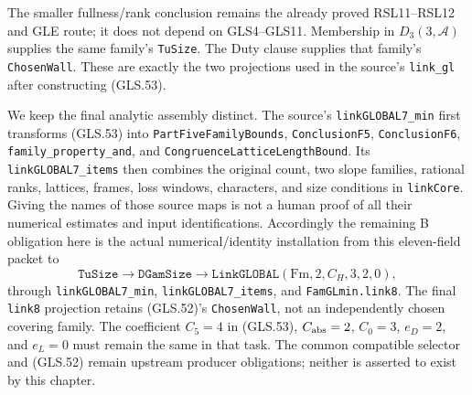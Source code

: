 The smaller fullness/rank conclusion remains the already proved
RSL11--RSL12 and GLE route; it does not depend on GLS4--GLS11.
Membership in $D_3(3,\mathcal A)$ supplies the same family's
\texttt{TuSize}.  The Duty clause supplies that family's
\texttt{ChosenWall}.  These are exactly the two projections used
in the source's \texttt{link\_gl} after constructing (GLS.53).

We keep the final analytic assembly distinct.  The source's
\texttt{linkGLOBAL7\_min} first transforms (GLS.53) into
\texttt{PartFiveFamilyBounds}, \texttt{ConclusionF5},
\texttt{ConclusionF6}, \texttt{family\_property\_and}, and
\texttt{CongruenceLatticeLengthBound}.  Its
\texttt{linkGLOBAL7\_items} then combines the original count,
two slope families, rational ranks, lattices, frames, loss windows,
characters, and size conditions in \texttt{linkCore}.
Giving the names of those source maps is not a human proof of all
their numerical estimates and input identifications.  Accordingly
the remaining B obligation here is the actual numerical/identity
installation from this eleven-field packet to
\[
 \texttt{TuSize}\to\texttt{DGamSize}\to
                    \texttt{LinkGLOBAL}(\mathrm{Fm},2,C_H,3,2,0),
 \tag{GLS.54}
\]
through \texttt{linkGLOBAL7\_min},
\texttt{linkGLOBAL7\_items}, and \texttt{FamGLmin.link8}.
The final \texttt{link8} projection retains (GLS.52)'s
\texttt{ChosenWall}, not an independently chosen covering family.
The coefficient $C_5=4$ in (GLS.53), $C_{\rm abs}=2$, $C_0=3$,
$e_D=2$, and $e_L=0$ must remain the same in that task.
The common compatible selector and (GLS.52) remain upstream
producer obligations; neither is asserted to exist by this chapter.
